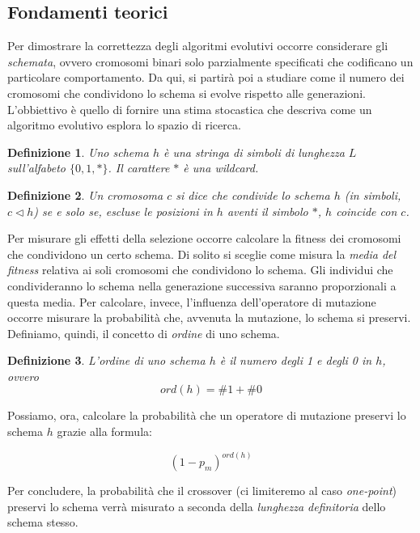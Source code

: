 \documentclass[10pt,a4paper]{article}
\newtheorem{definition}{Definizione}
\begin{document}
\subsection{Fondamenti teorici}

Per dimostrare la correttezza degli algoritmi evolutivi occorre considerare gli \emph{schemata}, ovvero cromosomi binari solo parzialmente specificati che codificano un particolare comportamento. Da qui, si partirà poi a studiare come il numero dei cromosomi che condividono lo schema si evolve rispetto alle generazioni. L'obbiettivo è quello di fornire una stima stocastica che descriva come un algoritmo evolutivo esplora lo spazio di ricerca.

\begin{definition}
Uno \emph{schema} $h$ è una stringa di simboli di lunghezza $L$ sull'alfabeto $\{0,1,*\}$. Il carattere $*$ è una wildcard.
\end{definition}

\begin{definition}
Un cromosoma $c$ si dice che \emph{condivide} lo schema $h$ (in simboli, $c \triangleleft h$) se e solo se, escluse le posizioni in $h$ aventi il simbolo $*$, $h$ coincide con $c$.
\end{definition}

Per misurare gli effetti della selezione occorre calcolare la fitness dei cromosomi che condividono un certo schema. Di solito si sceglie come misura la \emph{media del fitness} relativa ai soli cromosomi che condividono lo schema. Gli individui che condivideranno lo schema nella generazione successiva saranno proporzionali a questa media. Per calcolare, invece, l'influenza dell'operatore di mutazione occorre misurare la probabilità che, avvenuta la mutazione, lo schema si preservi. Definiamo, quindi, il concetto di \emph{ordine} di uno schema.

\begin{definition}
L'\emph{ordine} di uno schema $h$ è il numero degli 1 e degli 0 in $h$, ovvero 
$$
ord(h) = \#1 + \#0
$$
\end{definition}

Possiamo, ora, calcolare la probabilità che un operatore di mutazione preservi lo schema $h$ grazie alla formula:

$$
(1 - p_m)^{ord(h)}
$$

Per concludere, la probabilità che il crossover (ci limiteremo al caso \emph{one-point}) preservi lo schema verrà misurato a seconda della \emph{lunghezza definitoria} dello schema stesso.
\end{document}
